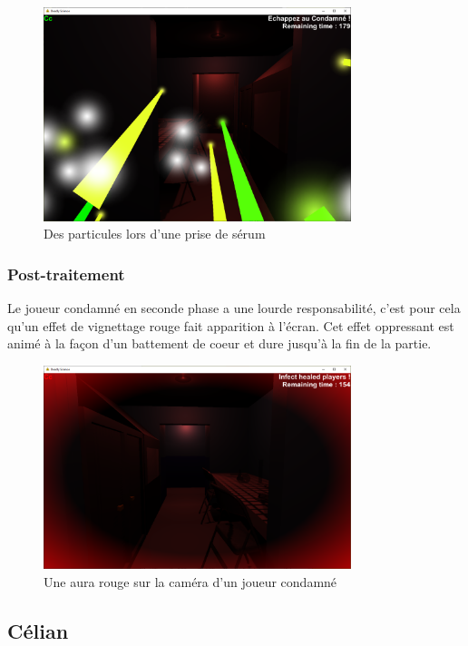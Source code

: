 \documentclass{article}
\begin{document}
\begin{figure}[H]
\centering
\includegraphics[width=0.8\textwidth]{cc/particles_example.png}
\caption{Des particules lors d'une prise de sérum}
\label{cc_c}
\end{figure}


\subsubsection{Post-traitement}


Le joueur condamné en seconde phase a une lourde responsabilité, c'est pour cela qu'un effet de vignettage rouge fait apparition à l'écran.
Cet effet oppressant est animé à la façon d'un battement de coeur et dure jusqu'à la fin de la partie.


\begin{figure}[H]
\centering
\includegraphics[width=0.8\textwidth]{cc/post_proc.png}
\caption{Une aura rouge sur la caméra d'un joueur condamné}
\label{cc_d}
\end{figure}


\newpage
\subsection{Célian}
\end{document}
